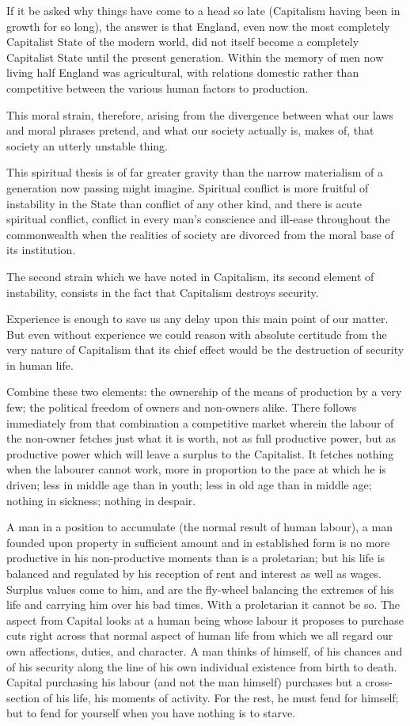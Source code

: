 \documentclass{book}
\begin{document}
If it be asked why things have come to a head so late (Capitalism having been in growth for so long), the answer is that England, even now the most completely Capitalist State of the modern world, did not itself become a completely Capitalist State until the present generation. Within the memory of men now living half England was agricultural, with relations domestic rather than competitive between the various human factors to production.

This moral strain, therefore, arising from the divergence between what our laws and moral phrases pretend, and what our society actually is, makes of, that society an utterly unstable thing.

This spiritual thesis is of far greater gravity than the narrow materialism of a generation now passing might imagine. Spiritual conflict is more fruitful of instability in the State than conflict of any other kind, and there is acute spiritual conflict, conflict in every man’s conscience and ill-ease throughout the commonwealth when the realities of society are divorced from the moral base of its institution.

The second strain which we have noted in Capitalism, its second element of instability, consists in the fact that Capitalism destroys security.

Experience is enough to save us any delay upon this main point of our matter. But even without experience we could reason with absolute certitude from the very nature of Capitalism that its chief effect would be the destruction of security in human life.

Combine these two elements: the ownership of the means of production by a very few; the political freedom of owners and non-owners alike. There follows immediately from that combination a competitive market wherein the labour of the non-owner fetches just what it is worth, not as full productive power, but as productive power which will leave a surplus to the Capitalist. It fetches nothing when the labourer cannot work, more in proportion to the pace at which he is driven; less in middle age than in youth; less in old age than in middle age; nothing in sickness; nothing in despair.

A man in a position to accumulate (the normal result of human labour), a man founded upon property in sufficient amount and in established form is no more productive in his non-productive moments than is a proletarian; but his life is balanced and regulated by his reception of rent and interest as well as wages. Surplus values come to him, and are the fly-wheel balancing the extremes of his life and carrying him over his bad times. With a proletarian it cannot be so. The aspect from Capital looks at a human being whose labour it proposes to purchase cuts right across that normal aspect of human life from which we all regard our own affections, duties, and character. A man thinks of himself, of his chances and of his security along the line of his own individual existence from birth to death. Capital purchasing his labour (and not the man himself) purchases but a cross-section of his life, his moments of activity. For the rest, he must fend for himself; but to fend for yourself when you have nothing is to starve.
\end{document}
